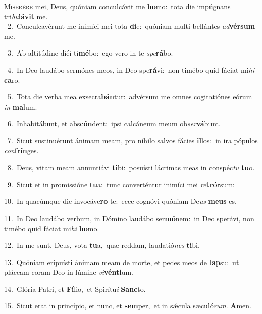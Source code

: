 \lettrine{\initial\textcolor{\initialcolor}{M}}{iserére} mei, Deus, quóniam conculcávit me \textbf{ho}\-mo:~\star tota die impúgnans tri\-\textit{bu}\-\textbf{lá}\textbf{vit} me.\\
{\numbfont\textcolor{\numbcolor}{~2.}}~Conculcavérunt me inimíci mei tota \textbf{di}\-e:~\star quóniam multi bellántes \textit{ad}\-\textbf{vér}\textbf{sum} me.\par
{\numbfont\textcolor{\numbcolor}{~3.}}~Ab altitúdine diéi ti\-\textbf{mé}\-bo:~\star ego vero in te \textit{spe}\-\textbf{rá}bo.\par
{\numbfont\textcolor{\numbcolor}{~4.}}~In Deo laudábo sermónes meos, in Deo spe\-\textbf{rá}\-vi:~\star non timébo quid fáciat mi\textit{hi} \textbf{ca}\-ro.\par
{\numbfont\textcolor{\numbcolor}{~5.}}~Tota die verba mea exsecra\-\textbf{bán}\-tur:~\star advérsum me omnes cogitatiónes eórum \textit{in} \textbf{ma}\-lum.\par
{\numbfont\textcolor{\numbcolor}{~6.}}~Inhabitábunt, et abs\-\textbf{cón}\-dent:~\star ipsi calcáneum meum ob\-\textit{ser}\-\textbf{vá}bunt.\par
{\numbfont\textcolor{\numbcolor}{~7.}}~Sicut sustinuérunt ánimam meam, pro níhilo salvos fácies \textbf{il}\-los:~\star in ira pópulos \textit{con}\-\textbf{frín}ges.\par
{\numbfont\textcolor{\numbcolor}{~8.}}~Deus, vitam meam annuntiávi \textbf{ti}\-bi:~\star posuísti lácrimas meas in conspéc\textit{tu} \textbf{tu}\-o.\par
{\numbfont\textcolor{\numbcolor}{~9.}}~Sicut et in promissióne \textbf{tu}\-a:~\star tunc converténtur inimíci mei \textit{re}\-\textbf{trór}sum:\par
{\numbfont\textcolor{\numbcolor}{10.}}~In quacúmque die invocáve\textbf{ro} te:~\star ecce cognóvi quóniam De\textit{us} \textbf{me}\-\textbf{us} es.\par
{\numbfont\textcolor{\numbcolor}{11.}}~In Deo laudábo verbum, in Dómino laudábo ser\-\textbf{mó}\-nem:~\star in Deo sperávi, non timébo quid fáciat mi\textit{hi} \textbf{ho}\-mo.\par
{\numbfont\textcolor{\numbcolor}{12.}}~In me sunt, Deus, vota \textbf{tu}\-a,~\star quæ reddam, laudatió\textit{nes} \textbf{ti}\-bi.\par
{\numbfont\textcolor{\numbcolor}{13.}}~Quóniam eripuísti ánimam meam de morte, et pedes meos de \textbf{lap}\-su:~\star ut pláceam coram Deo in lúmine \textit{vi}\-\textbf{vén}\textbf{ti}um.\par
{\numbfont\textcolor{\numbcolor}{14.}}~Glória Patri, et \textbf{Fí}\-lio,~\star et Spirítu\textit{i} \textbf{Sanc}\-to.\par
{\numbfont\textcolor{\numbcolor}{15.}}~Sicut erat in princípio, et nunc, et \textbf{sem}\-per,~\star et in sǽcula sæculó\-\textit{rum}\-. \textbf{A}\-men.\par
